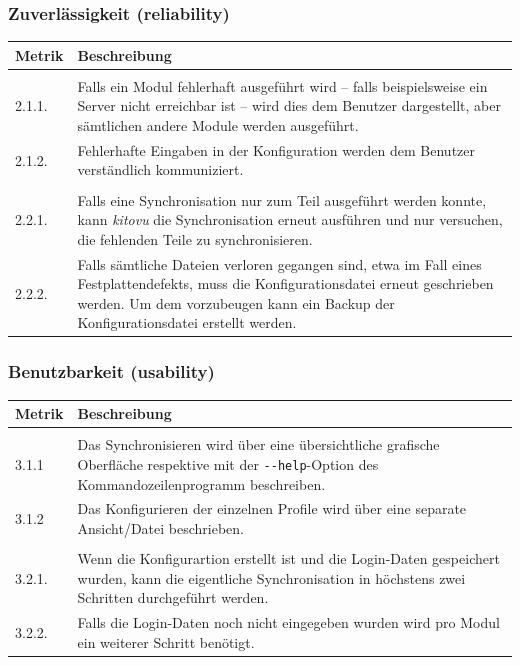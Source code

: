 \documentclass[a4paper]{article}
\begin{document}
\subsubsection{Zuverlässigkeit (reliability)}

\begin{tabulary}{\linewidth}{lL}
  \toprule
  Metrik & Beschreibung \\
  \midrule

   \\
  2.1.1. & Falls ein Modul fehlerhaft ausgeführt wird -- falls beispielsweise ein Server nicht erreichbar ist -- wird dies dem Benutzer dargestellt, aber sämtlichen andere Module werden ausgeführt. \\
  2.1.2. & Fehlerhafte Eingaben in der Konfiguration werden dem Benutzer verständlich kommuniziert. \\

   \\
  2.2.1. & Falls eine Synchronisation nur zum Teil ausgeführt werden konnte, kann \emph{kitovu} die Synchronisation erneut ausführen und nur versuchen, die fehlenden Teile zu synchronisieren. \\
  2.2.2. & Falls sämtliche Dateien verloren gegangen sind, etwa im Fall eines Festplattendefekts, muss die Konfigurationsdatei erneut geschrieben werden. Um dem vorzubeugen kann ein Backup der Konfigurationsdatei erstellt werden. \\
  \bottomrule
\end{tabulary}

\subsubsection{Benutzbarkeit (usability)}

\begin{tabulary}{\linewidth}{lL}
  \toprule
  Metrik & Beschreibung \\
  \midrule
   \\
  3.1.1 & Das Synchronisieren wird über eine übersichtliche grafische Oberfläche respektive mit der \verb|--help|-Option des Kommandozeilenprogramm beschreiben. \\
  3.1.2 & Das Konfigurieren der einzelnen Profile wird über eine separate Ansicht/Datei beschrieben. \\
   \\
  3.2.1. & Wenn die Konfigurartion erstellt ist und die Login-Daten gespeichert wurden, kann die eigentliche Synchronisation in höchstens zwei Schritten durchgeführt werden. \\
  3.2.2. & Falls die Login-Daten noch nicht eingegeben wurden wird pro Modul ein weiterer Schritt benötigt. \\
  \bottomrule
\end{tabulary}
\end{document}
